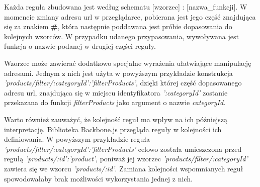 Każda reguła zbudowana jest według schematu [wzorzec] : [nazwa\_funkcji]. W momencie zmiany adresu url w przeglądarce, pobierana jest jego część znajdująca się za znakiem \textbf{\#}, która następnie poddawana jest próbie dopasowania do kolejnych wzorców. W przypadku udanego przypasowania, wywoływana jest funkcja o nazwie podanej w drugiej części reguły.

Wzorzec może zawierać dodatkowo specjalne wyrażenia ułatwiające manipulację adresami. Jednym z nich jest użyta w powyższym przykładzie konstrukcja \textit{'products/filter/:categoryId':'filterProducts'}, dzięki której część dopasowanego adresu url, znajdująca się w miejscu identyfikatora \textit{':categoryId'} zostanie przekazana do funkcji \textit{filterProducts} jako argument o nazwie \textit{categoryId}.

Warto również zauważyć, że kolejność reguł ma wpływ na ich późniejszą interpretację. Biblioteka Backbone.js przegląda reguły w kolejności ich definiowania. W powyższym przykładzie reguła \textit{'products/filter/:categoryId':'filterProducts'} celowo została umieszczona przed regułą \textit{'products/:id':'product'}, poniważ jej wzorzec \textit{'products/filter/:categoryId'} zawiera się we wzorcu \textit{'products/:id'}. Zamiana kolejności wspomnianych reguł spowodowałaby brak możliwości wykorzystania jednej z nich.\cite{backbone}